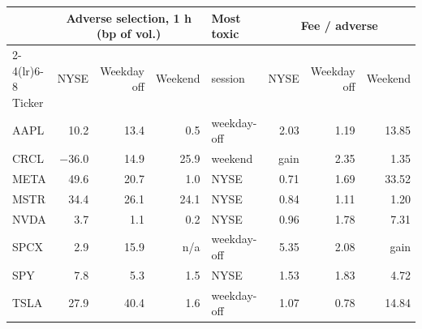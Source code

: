 \begin{tabular}{lrrrlrrr}
\toprule
 & \multicolumn{3}{c}{Adverse selection, 1 h (bp of vol.)} & Most toxic & \multicolumn{3}{c}{Fee / adverse} \\
\cmidrule(lr){2-4}\cmidrule(lr){6-8}
Ticker & NYSE & Weekday off & Weekend & session & NYSE & Weekday off & Weekend \\
\midrule
AAPL & 10.2 & 13.4 & 0.5 & weekday-off & 2.03 & 1.19 & 13.85 \\
CRCL & $-$36.0 & 14.9 & 25.9 & weekend & gain & 2.35 & 1.35 \\
META & 49.6 & 20.7 & 1.0 & NYSE & 0.71 & 1.69 & 33.52 \\
MSTR & 34.4 & 26.1 & 24.1 & NYSE & 0.84 & 1.11 & 1.20 \\
NVDA & 3.7 & 1.1 & 0.2 & NYSE & 0.96 & 1.78 & 7.31 \\
SPCX & 2.9 & 15.9 & n/a & weekday-off & 5.35 & 2.08 & gain \\
SPY & 7.8 & 5.3 & 1.5 & NYSE & 1.53 & 1.83 & 4.72 \\
TSLA & 27.9 & 40.4 & 1.6 & weekday-off & 1.07 & 0.78 & 14.84 \\
\bottomrule
\end{tabular}
